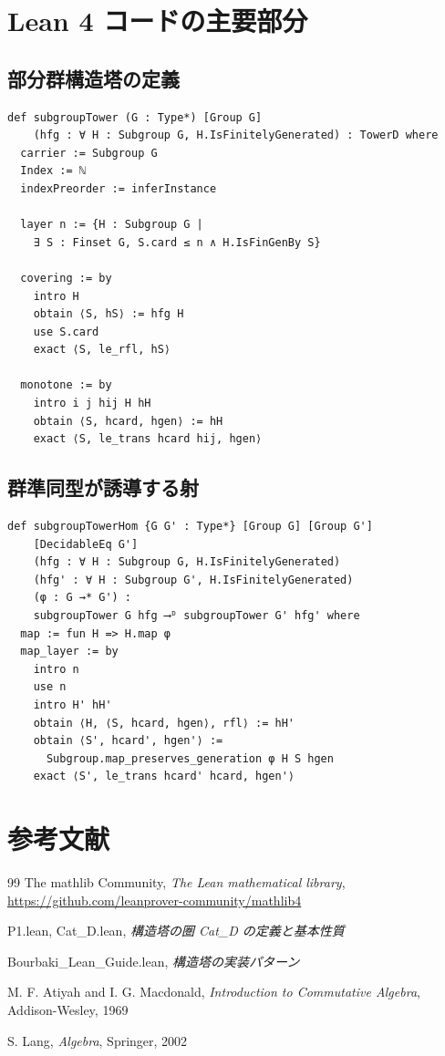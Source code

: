 \documentclass[a4paper,12pt]{ltjsarticle}
\theoremstyle{definition}
\begin{document}
\appendix

\section{Lean 4 コードの主要部分}

\subsection{部分群構造塔の定義}

\begin{verbatim}
def subgroupTower (G : Type*) [Group G]
    (hfg : ∀ H : Subgroup G, H.IsFinitelyGenerated) : TowerD where
  carrier := Subgroup G
  Index := ℕ
  indexPreorder := inferInstance

  layer n := {H : Subgroup G |
    ∃ S : Finset G, S.card ≤ n ∧ H.IsFinGenBy S}

  covering := by
    intro H
    obtain ⟨S, hS⟩ := hfg H
    use S.card
    exact ⟨S, le_rfl, hS⟩

  monotone := by
    intro i j hij H hH
    obtain ⟨S, hcard, hgen⟩ := hH
    exact ⟨S, le_trans hcard hij, hgen⟩
\end{verbatim}

\subsection{群準同型が誘導する射}

\begin{verbatim}
def subgroupTowerHom {G G' : Type*} [Group G] [Group G']
    [DecidableEq G']
    (hfg : ∀ H : Subgroup G, H.IsFinitelyGenerated)
    (hfg' : ∀ H : Subgroup G', H.IsFinitelyGenerated)
    (φ : G →* G') :
    subgroupTower G hfg ⟶ᴰ subgroupTower G' hfg' where
  map := fun H => H.map φ
  map_layer := by
    intro n
    use n
    intro H' hH'
    obtain ⟨H, ⟨S, hcard, hgen⟩, rfl⟩ := hH'
    obtain ⟨S', hcard', hgen'⟩ :=
      Subgroup.map_preserves_generation φ H S hgen
    exact ⟨S', le_trans hcard' hcard, hgen'⟩
\end{verbatim}

\section{参考文献}

\begin{thebibliography}{99}
The mathlib Community,
\textit{The Lean mathematical library},
\url{https://github.com/leanprover-community/mathlib4}

P1.lean, Cat\_D.lean,
\textit{構造塔の圏 Cat\_D の定義と基本性質}

Bourbaki\_Lean\_Guide.lean,
\textit{構造塔の実装パターン}

M. F. Atiyah and I. G. Macdonald,
\textit{Introduction to Commutative Algebra},
Addison-Wesley, 1969

S. Lang,
\textit{Algebra},
Springer, 2002
\end{thebibliography}
\end{document}
